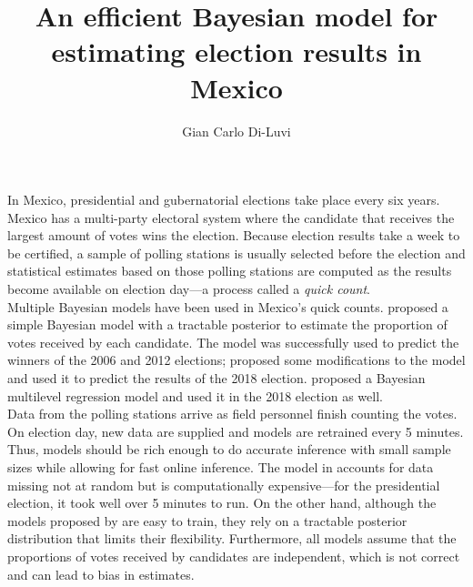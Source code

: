 \documentclass[11pt]{article}
\title{\vspace{-2cm}An efficient Bayesian model for estimating election results in Mexico}
\author{Gian Carlo Di-Luvi}
\date{}
\begin{document}
\maketitle


In Mexico, presidential and gubernatorial elections take place every six years. Mexico has a multi-party electoral system where the candidate that receives the largest amount of votes wins the election. Because election results take a week to be certified, a sample of polling stations is usually selected before the election and statistical estimates based on those polling stations are computed as the results become available on election day---a process called a \textit{quick count}.
\\



Multiple Bayesian models have been used in Mexico's quick counts. \citet{mendoza-nieto2016} proposed a simple Bayesian model with a tractable posterior to estimate the proportion of votes received by each candidate. The model was successfully used to predict the winners of the 2006 and 2012 elections; \citet{diluvi2018} proposed some modifications to the model and used it to predict the results of the 2018 election. \citet{anzarut2018} proposed a Bayesian multilevel regression model and used it in the 2018 election as well.
\\




Data from the polling stations arrive as field personnel finish counting the votes. On election day, new data are supplied and models are retrained every 5 minutes. Thus, models should be rich enough to do accurate inference with small sample sizes while allowing for fast online inference. The model in \citep{anzarut2018} accounts for data missing not at random but is computationally expensive---for the presidential election, it took well over 5 minutes to run. On the other hand, although the models proposed by \citep{mendoza-nieto2016, diluvi2018} are easy to train, they rely on a tractable posterior distribution that limits their flexibility. Furthermore, all models assume that the proportions of votes received by candidates are independent, which is not correct and can lead to bias in estimates.
\\
\end{document}

